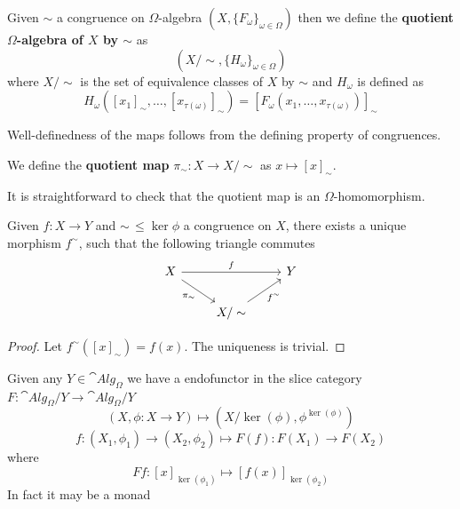 \begin{definition}
    Given $\sim$ a congruence on $\Omega$-algebra $(X,\{F_\omega\}_{\omega\in\Omega})$
    then we define the \textbf{quotient $\Omega$-algebra of $X$ by $\sim$} as 
    \[
        (X/\sim,\{H_\omega\}_{\omega\in\Omega})
    \]
    where $X/\sim$ is the set of equivalence classes of $X$ by $\sim$ and $H_\omega$ is defined as 
    \[
        H_\omega([x_1]_\sim,\dots,[x_{\tau(\omega)}]_\sim) = [F_\omega(x_1,\dots,x_{\tau(\omega)})]_\sim
    \]
\end{definition}
\begin{remark}
    Well-definedness of the maps follows from the defining property of congruences.
\end{remark}
\begin{definition}
    We define the \textbf{quotient map} $\pi_\sim : X \to X/\sim$ as $x\mapsto [x]_\sim$.
\end{definition}
\begin{remark}
    It is straightforward to check that the quotient map is an $\Omega$-homomorphism.
\end{remark}
\begin{proposition}
    Given $f : X \to Y$ and $\sim\,\leq\ker\phi$ a congruence on $X$, there exists a unique morphism $f^\sim$, such
    that the following triangle commutes
    \[\begin{tikzcd}
	X && Y \\
	& {X/\sim}
	\arrow["f", from=1-1, to=1-3]
	\arrow["{\pi_\sim}"', from=1-1, to=2-2]
	\arrow["{f^\sim}"', from=2-2, to=1-3]
\end{tikzcd}\]
\end{proposition}
\begin{proof}[Proof]
    Let $f^\sim([x]_\sim) = f(x)$. The uniqueness is trivial.
\end{proof}
Given any $Y \in\cat{Alg}_\Omega$ we have a endofunctor in 
the slice category $F: \cat{Alg}_\Omega/Y \to\cat{Alg}_\Omega/Y$
\[
    (X,\phi : X \to Y) \mapsto (X/\ker(\phi), \phi^{\ker(\phi)})
\]
\[
    f : (X_1,\phi_1) \to (X_2,\phi_2) \mapsto F(f) : F(X_1) \to F(X_2)
\]
where
\[
    Ff : [x]_{\ker(\phi_1)} \mapsto [f(x)]_{\ker(\phi_2)}
\]
In fact it may be a monad

